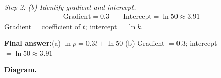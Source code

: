 \documentclass[11pt]{article}
\begin{document}
\textit{Step 2: (b) Identify gradient and intercept.}
\[\begin{gathered}
\text{Gradient} = 0.3 \qquad \text{Intercept} = \ln 50 \approx 3.91
\end{gathered}\]
Gradient = coefficient of \( t \); intercept = \( \ln k \).

\begin{answerbox}
\textbf{Final answer:}\quad (a) \(\displaystyle  \ln p = 0.3t + \ln 50 \) \quad  (b) Gradient \(\displaystyle  = 0.3 \); intercept \(\displaystyle  = \ln 50 \approx 3.91 \)
\end{answerbox}
\textbf{Diagram.}

\begin{center}
\end{center}
\end{document}
